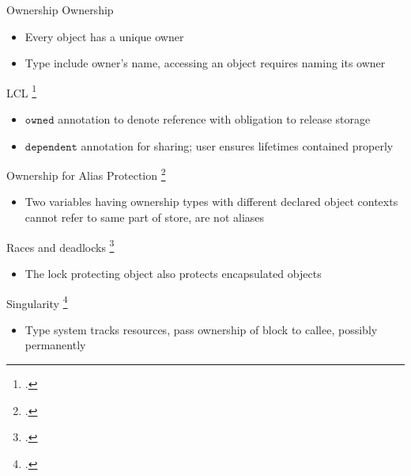 \documentclass[aspectratio=169]{beamer}
\begin{document}
\begin{frame}{Ownership}
\footnotesize
Ownership
    \begin{itemize}
      \item Every object has a unique owner
      \item Type include owner's name, accessing an object requires naming its owner
    \end{itemize}
  LCL \footcite{evans_static_1996}
    \vspace{-0.1in}
    \begin{itemize}
        \item $\texttt{owned}$ annotation to denote reference with obligation to release storage
        \item $\texttt{dependent}$ annotation for sharing; user ensures lifetimes contained properly %
    \end{itemize}
  Ownership for Alias Protection \footcite{clarke_ownership_1998}
    \vspace{-0.1in}
    \begin{itemize}
      \item Two variables having ownership types with different declared object contexts cannot refer to same part of store, are not aliases
    \end{itemize}
  Races and deadlocks \footcite{boyapati_ownership_2002}
    \vspace{-0.1in}
    \begin{itemize}
      \item The lock protecting object also protects encapsulated objects
    \end{itemize}
  Singularity \footcite{fahndrich_language_2006}
    \vspace{-0.1in}
    \begin{itemize}
        \item Type system tracks resources, pass ownership of block to callee, possibly permanently
    \end{itemize}
  \vspace{0.1in}
\end{frame}
\end{document}
